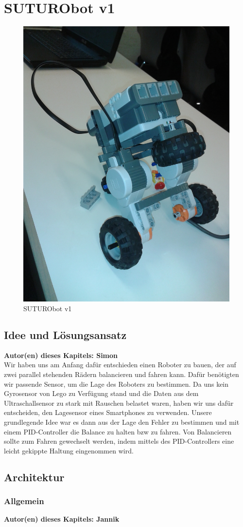 \documentclass[8pt]{article}
\newcommand{\secauthor}[1]{\textbf{Autor(en) dieses Kapitels: {#1}}\\}
\begin{document}
\section{SUTURObot v1}
\begin{figure}[h]
  \begin{center}
    \includegraphics[width=.5\textwidth]{pictures/SUTURObot-v1.jpg}  
  \end{center}
  \caption{SUTURObot v1}
  \label{fig:SUTURObot1}
\end{figure}

\subsection{Idee und Lösungsansatz} 
\secauthor{Simon}
Wir haben uns am Anfang dafür entschieden einen Roboter zu bauen, der auf zwei parallel stehenden Rädern balancieren und fahren kann. Dafür benötigten wir passende Sensor, um die Lage des Roboters zu bestimmen. Da uns kein Gyrosensor von Lego zu Verfügung stand und die Daten aus dem Ultraschallsensor zu stark mit Rauschen belastet waren, haben wir uns dafür entscheiden, den Lagesensor eines Smartphones zu verwenden. Unsere grundlegende Idee war es dann aus der Lage den Fehler zu bestimmen und mit einem PID-Controller die Balance zu halten bzw zu fahren. Von Balancieren sollte zum Fahren gewechselt werden, indem mittels des PID-Controllers eine leicht gekippte Haltung eingenommen wird.

\subsection{Architektur}

\subsubsection{Allgemein} 
\secauthor{Jannik}
\end{document}
